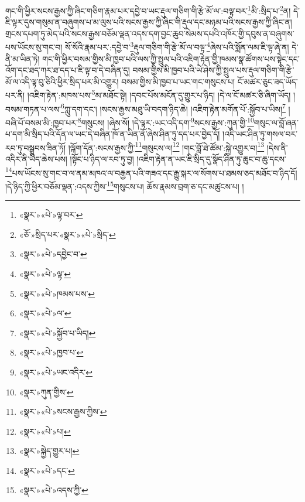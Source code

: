 གང་གི་ཕྱིར་སངས་རྒྱས་ཀྱི་ཞིང་གཅིག་རྣམ་པར་དབྱེ་བ་ཡང་རྡུལ་གཅིག་གི་རྩེ་མོ་ལ་:བལྟ་བར་\footnote{«སྣར་»«པེ་»ལྟ་བར་}མི་:སྲིད་པ་\footnote{«ཅོ་»སྲིད་པར་«སྣར་»«པེ་»སྲིད་}ན། དེ་ཇི་ལྟར་དུས་གསུམ་ན་བཞུགས་པ་མ་ལུས་པའི་སངས་རྒྱས་ཀྱི་ཞིང་གི་རྡུལ་དང་མཉམ་པའི་སངས་རྒྱས་ཀྱི་ཞིང་ན། གྲངས་དཔག་ཏུ་མེད་པའི་སངས་རྒྱས་བཅོམ་ལྡན་འདས་དག་བྱང་ཆུབ་སེམས་དཔའི་འཁོར་གྱི་དབུས་ན་བཞུགས་པས་ཡོངས་སུ་གང་བ། སོ་སོའི་རྣམ་པར་:དབྱེ་བ་\footnote{«སྣར་»«པེ་»དབྱེང་བ་}རྡུལ་གཅིག་གི་རྩེ་མོ་ལ་བལྟ་\footnote{«སྣར་»«པེ་»ལྟ་}ཞེས་པའི་སྨོན་ལམ་ཇི་ལྟ་ཞེ་ན། དེ་ནི་མ་ཡིན་ཏེ། གང་གི་ཕྱིར་བསམ་གྱིས་མི་ཁྱབ་པའི་ལས་ཀྱི་སྤྲུལ་པའི་འཇིག་རྟེན་གྱི་ཁམས་སྣ་ཚོགས་པས་སྟེང་དང་འོག་དང་ཐད་ཀར་ཐ་དད་པ་ཇི་ལྟ་བ་དེ་བཞིན་དུ། བསམ་གྱིས་མི་ཁྱབ་པའི་ཡེ་ཤེས་ཀྱི་སྤྲུལ་པས་རྡུལ་གཅིག་གི་རྩེ་མོ་ལ་འདི་ལྟ་བུ་ཅིའི་ཕྱིར་སྲིད་པར་མི་འགྱུར། བསམ་གྱིས་མི་ཁྱབ་པ་ཡང་གང་གསུངས་པ། ངོ་མཚར་ཅུང་ཟད་ཡོད་པར་ནི། །འཇིག་རྟེན་:མཁས་པས་\footnote{«སྣར་»«པེ་»ཁམས་པས་}མ་མཐོང་སྟེ། །དབང་པོས་མངོན་དུ་གྱུར་པ་ཉིད། །དེ་ལ་ངོ་མཚར་ཅི་ཞིག་ཡོད། །བསམ་གཏན་པ་ལས་\footnote{«སྣར་»«པེ་»ལ་}ཀླུ་དག་དང་། །སངས་རྒྱས་མཐུ་ཡི་བདག་ཉིད་ཆེ། །འཇིག་རྟེན་མགོན་པོ་:སྐྱོབ་པ་ཡིས།\footnote{«སྣར་»«པེ་»སྐྱོབ་པ་ཡིད།} །བཞི་པོ་བསམ་མི་:ཁྱབ་པར་\footnote{«སྣར་»«པེ་»ཁྱབ་པ་}གསུངས། །ཞེས་སོ། །དེ་ལྟར་:ཡང་འདི་དག་\footnote{«སྣར་»«པེ་»ཡང་འདིར་}སངས་རྒྱས་:ཀུན་གྱི་\footnote{«སྣར་»ཀུན་གྱིས་}གསུང་ལ་བློ་ཞན་པ་དག་མི་སྲིད་པའི་དོན་ལ་ཡང་དེ་བཞིན་ཁོ་ན་ཡིན་ནོ་ཞེས་ཤིན་ཏུ་དད་པར་བྱེད་དོ། །འདི་ཡང་ཤིན་ཏུ་གསལ་བར་རབ་ཏུ་བསྒྲུབས་ཟིན་ཏོ། །ལྐོག་དོན་:སངས་རྒྱས་ཀྱི་\footnote{«སྣར་»«པེ་»སངས་རྒྱས་ཀྱིས་}གསུངས་ལ།\footnote{«སྣར་»«པེ་»པ།} །གང་བློ་ཐེ་ཚོམ་:སྐྱེ་འགྱུར་བ།\footnote{«སྣར་»སྐྱེད་གྱུར་པ།} །དེས་ནི་འདིར་ནི་ཡིད་ཆེས་པས། །སྟོང་པ་ཉིད་ལ་རབ་ཏུ་བྱ། །འཇིག་རྟེན་ན་ཡང་ཇི་སྲིད་དུ་སྣོད་ཤིན་ཏུ་ཆུང་བ་ཆུ་དངས་\footnote{«སྣར་»«པེ་»དང་}པས་ཡོངས་སུ་གང་བ་ལ་ནམ་མཁའ་ལ་བརྒྱན་པའི་གཟའ་དང་རྒྱུ་སྐར་ལ་སོགས་པ་ཐམས་ཅད་མཐོང་བ་ཉིད་དོ། །དེ་ཉིད་ཀྱི་ཕྱིར་བཅོམ་ལྡན་:འདས་ཀྱིས་\footnote{«སྣར་»«པེ་»འདས་ཀྱི་}གསུངས་པ། ཆོས་རྣམས་བྲག་ཅ་དང་མཚུངས་པ། །
